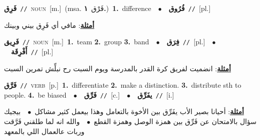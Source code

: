 \documentclass[10pt,a4paper,twoside]{article} %
\begin{document}
\begin{multicols}{2}
{\setlength\topsep{0pt}\textbf{\foreignlanguage{arabic}{فَرِق}}\ {\color{gray}\texttt{//}\color{black}}\ \textsc{noun}\ [m.]\ \color{gray}(msa. \foreignlanguage{arabic}{فَرْق}~\foreignlanguage{arabic}{\textbf{١.}})\color{black}\ \textbf{1.}~difference\ \ $\bullet$\ \ \setlength\topsep{0pt}\textbf{\foreignlanguage{arabic}{فُرُوق}}\ {\color{gray}\texttt{//}\color{black}}\ [pl.]\  \begin{flushright}\color{gray}\foreignlanguage{arabic}{\textbf{\underline{\foreignlanguage{arabic}{أمثلة}}}: مافي أي فَرِق بيني وبينك}\end{flushright}\color{black}} \vspace{2mm}

{\setlength\topsep{0pt}\textbf{\foreignlanguage{arabic}{فَرِيق}}\ {\color{gray}\texttt{//}\color{black}}\ \textsc{noun}\ [m.]\ \textbf{1.}~team  \textbf{2.}~group  \textbf{3.}~band\ \ $\bullet$\ \ \setlength\topsep{0pt}\textbf{\foreignlanguage{arabic}{فِرَق}}\ {\color{gray}\texttt{//}\color{black}}\ [pl.]\ \ $\bullet$\ \ \setlength\topsep{0pt}\textbf{\foreignlanguage{arabic}{أَفْرِقَة}}\ {\color{gray}\texttt{//}\color{black}}\ [pl.]\  \begin{flushright}\color{gray}\foreignlanguage{arabic}{\textbf{\underline{\foreignlanguage{arabic}{أمثلة}}}: انضميت لفريق كرة القدر بالمدرسة ويوم السبت رح نبلِّش تمرين السبت}\end{flushright}\color{black}} \vspace{2mm}

{\setlength\topsep{0pt}\textbf{\foreignlanguage{arabic}{فَرَّق}}\ {\color{gray}\texttt{//}\color{black}}\ \textsc{verb}\ [p.]\ \textbf{1.}~differentiate  \textbf{2.}~make a distinction.  \textbf{3.}~distribute sth to people.  \textbf{4.}~be biased\ \ $\bullet$\ \ \setlength\topsep{0pt}\textbf{\foreignlanguage{arabic}{فَرِّق}}\ {\color{gray}\texttt{//}\color{black}}\ [c.]\ \ $\bullet$\ \ \setlength\topsep{0pt}\textbf{\foreignlanguage{arabic}{يفَرِّق}}\ {\color{gray}\texttt{//}\color{black}}\ [i.]\  \begin{flushright}\color{gray}\foreignlanguage{arabic}{\textbf{\underline{\foreignlanguage{arabic}{أمثلة}}}: أحيانا بصير الأب يفَرِّق بين الأخوة بالتعامل وهذا بيعمل كثير مشاكل\ $\bullet$\ \  بيجيك سؤال بالامتحان عن فَرِّق بين همزة الوصل وهمزة القطع\ $\bullet$\ \  والله انه لما طلقني فَرَّقت وربات عالعمال اللي بالمعهد}\end{flushright}\color{black}} \vspace{2mm}


\end{multicols}
\end{document}
